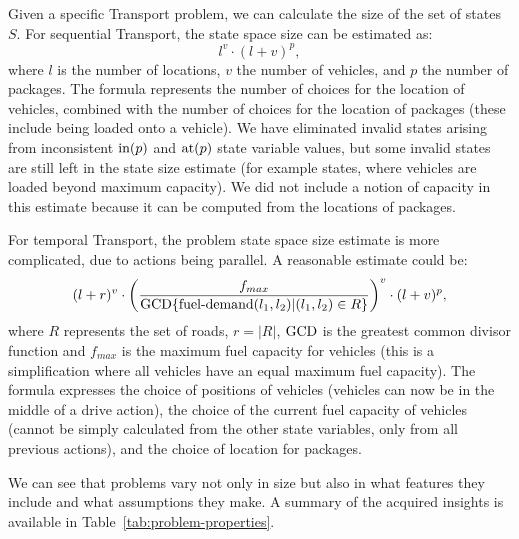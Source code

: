 Given a specific Transport problem, we can calculate the size of the set of states $S$.
For sequential Transport, the state space size can be estimated as: $$l^v \cdot (l+v)^p,$$ where $l$ is the number of locations,
$v$ the number of vehicles, and $p$ the number of packages. The formula represents
the number of choices for the location of vehicles, combined with the number of choices
for the location of packages (these include being loaded onto a vehicle). We have eliminated
invalid states arising from inconsistent $\textrm{in}(p)$ and $\textrm{at}(p)$ state variable values,
but some invalid states are still left in the state size estimate (for example states,
where vehicles are loaded beyond maximum capacity). We did not include a notion of
capacity in this estimate because it can be computed from the locations of packages.

For temporal Transport, the problem state space size estimate is more complicated,
due to actions being parallel. A reasonable estimate could be:
$$(l+r)^v \cdot \left(\frac{f_{max}}{\textrm{GCD} \{\textrm{fuel-demand}(l_1, l_2) | (l_1, l_2) \in R\}}\right)^v \cdot (l+v)^p,$$ where $R$ represents the set of roads, $r = |R|$,
$\textrm{GCD}$ is the greatest common divisor function
and $f_{max}$ is the maximum fuel capacity for vehicles (this is a simplification where all vehicles
have an equal maximum fuel capacity).
The formula expresses the choice of positions of vehicles (vehicles can now be in the middle
of a drive action), the choice of the current fuel capacity of vehicles (cannot be simply
calculated from the other state variables, only from all previous actions),
and the choice of location for packages.

We can see that problems vary not only in size but also in what features they include
and what assumptions they make.
A summary of the acquired insights is available in Table~\ref{tab:problem-properties}.

